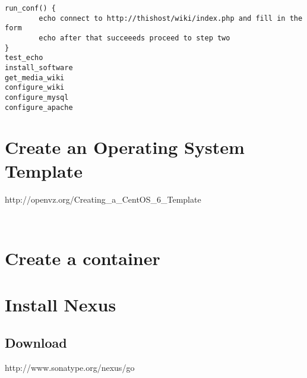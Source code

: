 \begin{verbatim}
run_conf() {
        echo connect to http://thishost/wiki/index.php and fill in the form
        echo after that succeeeds proceed to step two
}
test_echo
install_software
get_media_wiki
configure_wiki
configure_mysql
configure_apache
\end{verbatim}

\section{Create an Operating System Template}
http://openvz.org/Creating_a_CentOS_6_Template
\begin{verbatim}
 

\end{verbatim}

\section{Create a container}

\section{Install Nexus}
\subsection{Download}
http://www.sonatype.org/nexus/go

